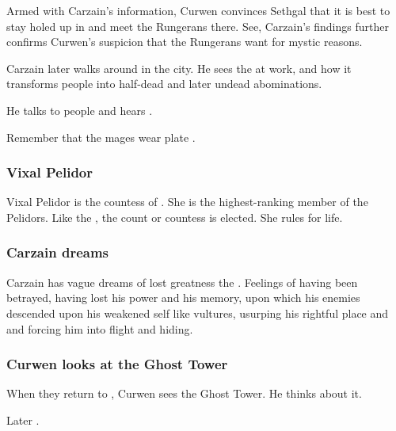 Armed with Carzain's information, Curwen convinces Sethgal that it is best to stay holed up in \Forclin{} and meet the Rungerans there. 
See, Carzain's findings further confirms Curwen's suspicion that the Rungerans want \Forclin{} for mystic reasons. 

Carzain later walks around in the city. He sees the  at work, and how it transforms people into half-dead and later undead abominations. 

He talks to people and hears . 

Remember that the \ishrah{} mages wear plate \armour. 





\subsubsection{Vixal Pelidor}
Vixal Pelidor is the countess of \Forclin. 
She is the highest-ranking member of the \Forcliner{} Pelidors. 
Like the \rayuth, the count or countess is elected. 
She rules for life. 





\subsubsection{Carzain dreams}
Carzain has vague dreams of lost greatness the {\Mystraacht{} \matrix}. 
Feelings of having been betrayed, having lost his power and his memory, upon which his enemies descended upon his weakened self like vultures, usurping his rightful place and \honour and forcing him into flight and hiding. 





\subsubsection{Curwen looks at the Ghost Tower}
When they return to \Forclin, Curwen sees the Ghost Tower. 
He thinks about it.

Later . 











